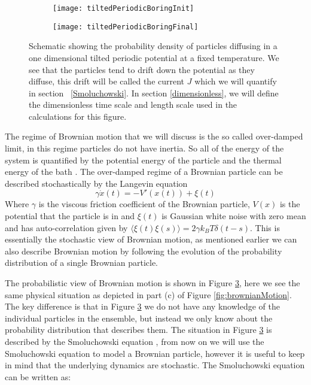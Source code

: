\begin{figure}[tb]
	\begin{subfigure}{0.49\textwidth}
		\texttt{[image: tiltedPeriodicBoringInit]}
		\caption{\label{fig:Init}}
	\end{subfigure}
\begin{subfigure}{0.49\textwidth}
		\texttt{[image: tiltedPeriodicBoringFinal]}
		\caption{\label{fig:Final}}
\end{subfigure}
\caption{Schematic showing the probability density of particles diffusing in a one dimensional tilted periodic potential at a fixed temperature. We see that the particles tend to drift down the potential as they diffuse, this drift will be called the current $J$ which we will quantify in section ~\autoref{Smoluchowski}. In section \ref{dimensionless}, we will define the dimensionless time scale and length scale used in the calculations for this figure.}
\label{fig:Schematic}
\end{figure}

The regime of Brownian motion that we will discuss is the so called over-damped limit, in this regime particles do not have inertia. So all of the energy of the system is quantified by the potential energy of the particle and the thermal energy of the bath \cite{Streater1997,Streater1997a,Streater2000,Streater1997b}. The over-damped regime of a Brownian particle can be described stochastically by the Langevin equation 
\begin{equation}
	\gamma \dot x(t) = - V'(x(t)) + \xi(t)
\end{equation}
Where $\gamma$ is the viscous friction coefficient of the Brownian particle, $V(x)$ is the potential that the particle is in and $\xi(t)$ is Gaussian white noise with zero mean and has auto-correlation given by $\langle \xi(t) \xi(s) \rangle = 2 \gamma k_B T \delta(t - s)$. This is essentially the stochastic view of Brownian motion, as mentioned earlier we can also describe Brownian motion by following the evolution of the probability distribution of a single Brownian particle.

The probabilistic view of Brownian motion is shown in Figure \ref{fig:Schematic}, here we see the same physical situation as depicted in part (c) of Figure \ref{fig:brownianMotion}. The key difference is that in Figure \ref{fig:Schematic} we do not have any knowledge of the individual particles in the ensemble, but instead we only know about the probability distribution that describes them. The situation in Figure \ref{fig:Schematic} is described by the Smoluchowski equation \cite{Gardiner2009}, from now on we will use the Smoluchowski equation to model a Brownian particle, however it is useful to keep in mind that the underlying dynamics are stochastic. The Smoluchowski equation can be written as:

